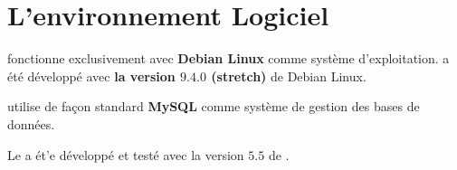 \chapter{L'environnement Logiciel}\label{chap:environement-logiciel-requis}



\yeren fonctionne exclusivement avec \textbf{Debian Linux}
comme syst\`eme d'exploitation.
\yeren a \'et\'e d\'evelopp\'e avec \textbf{la version
$\mathbf{9.4.0}$ (stretch)} de Debian Linux.


\label{sec:yeren-sgbd}

\yeren utilise de fa\c{c}on standard \textbf{MySQL} comme
syst\`eme de gestion des bases de donn\'ees.


Le \pos \yeren a \'et'e d\'evelopp\'e et test\'e avec
la version $5.5$ de \mysql.


